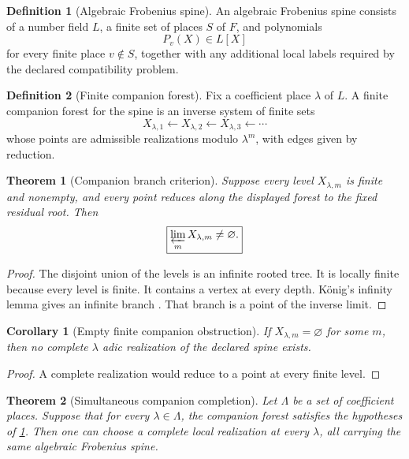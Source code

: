 \documentclass{aomart}
\newtheorem{theorem}{Theorem}[section]
\newtheorem{corollary}[corollary]{Corollary}
\theoremstyle{definition}
\newtheorem{definition}[definition]{Definition}
\theoremstyle{remark}
\begin{document}
\begin{definition}[Algebraic Frobenius spine]\label{def:frobenius_spine}
An algebraic Frobenius spine consists of a number field \(L\), a finite set of places \(S\) of \(F\), and polynomials
\[
P_v(X)\in L[X]
\]
for every finite place \(v\notin S\), together with any additional local labels required by the declared compatibility problem.
\end{definition}

\begin{definition}[Finite companion forest]\label{def:companion_forest}
Fix a coefficient place \(\lambda\) of \(L\). A finite companion forest for the spine is an inverse system of finite sets
\[
X_{\lambda,1}
\longleftarrow
X_{\lambda,2}
\longleftarrow
X_{\lambda,3}
\longleftarrow\cdots
\]
whose points are admissible realizations modulo \(\lambda^m\), with edges given by reduction.
\end{definition}

\begin{theorem}[Companion branch criterion]\label{thm:companion_branch_criterion}
Suppose every level \(X_{\lambda,m}\) is finite and nonempty, and every point reduces along the displayed forest to the fixed residual root. Then
\[
\boxed{
\varprojlim_mX_{\lambda,m}
\neq\varnothing.
}
\]
\end{theorem}

\begin{proof}
The disjoint union of the levels is an infinite rooted tree. It is locally finite because every level is finite. It contains a vertex at every depth. König's infinity lemma gives an infinite branch \cite{Diestel2017}. That branch is a point of the inverse limit.
\end{proof}

\begin{corollary}[Empty finite companion obstruction]\label{cor:empty_companion_obstruction}
If \(X_{\lambda,m}=\varnothing\) for some \(m\), then no complete \(\lambda\) adic realization of the declared spine exists.
\end{corollary}

\begin{proof}
A complete realization would reduce to a point at every finite level.
\end{proof}

\begin{theorem}[Simultaneous companion completion]\label{thm:simultaneous_companion_completion}
Let \(\Lambda\) be a set of coefficient places. Suppose that for every \(\lambda\in\Lambda\), the companion forest satisfies the hypotheses of \cref{thm:companion_branch_criterion}. Then one can choose a complete local realization at every \(\lambda\), all carrying the same algebraic Frobenius spine.
\end{theorem}
\end{document}
